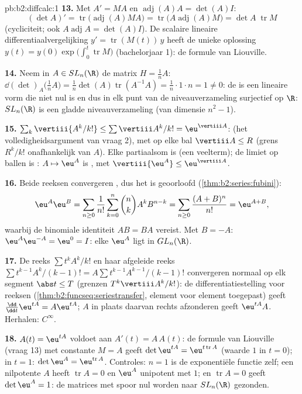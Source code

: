 \begin{solution}{pb:b2:diffcalc:1}
\textbf{13.} Met $A' = MA$ en $\operatorname{adj}(A)A = \det(A)I$:
\[
(\det A)' = \operatorname{tr}\bigl(\operatorname{adj}(A)MA
\bigr)
= \operatorname{tr}\bigl(A\operatorname{adj}(A)M\bigr)
= \det A\;\operatorname{tr}M
\]
(cycliciteit; ook $A\operatorname{adj}A = \det(A) I$). De scalaire
lineaire differentiaalvergelijking $y' = \operatorname{tr}(M(t))\,y$
heeft de unieke oplossing $y(t) = y(0)\exp\bigl(\int_0^t
\operatorname{tr}M\bigr)$ (bachelorjaar 1): de formule van
Liouville.

\textbf{14.} Neem in $A \in SL_n(\R)$ de matrix $H = \frac1nA$:
$\dd(\det)_A\bigl(\tfrac1nA\bigr) = \frac1n\det(A)
\operatorname{tr}(A^{-1}A) = \frac1n\cdot1\cdot n = 1 \neq 0$: de
 is een lineaire vorm die niet nul is en dus in elk
punt van de niveauverzameling surjectief op $\R$: $SL_n(\R)$ is een
gladde niveauverzameling (van dimensie $n^2 - 1$).

\textbf{15.} $\sum_k\vertiii{A^k/k!} \leq \sum\vertiii A^k/k! =
\eu^{\vertiii A}$:  (het volledigheidsargument
van vraag 2), met  op elke bal $\vertiii A \leq
R$ (grens $R^k/k!$ onafhankelijk van $A$). Elke partiaalsom is
 (een veelterm); de  limiet op ballen is : $A
\mapsto \eu^A$ is , met $\vertiii{\eu^A} \leq \eu^{\vertiii
A}$.

\textbf{16.} Beide reeksen convergeren , dus het
 is geoorloofd (\cref{thm:b2:series:fubini}):
\[
\eu^A\eu^B = \sum_{n\geq0}\frac{1}{n!}\sum_{k=0}^n\binom
nkA^kB^{n-k}
= \sum_{n\geq0}\frac{(A+B)^n}{n!} = \eu^{A+B},
\]
waarbij de binomiale identiteit $AB = BA$ vereist. Met $B = -A$:
$\eu^A\eu^{-A} = \eu^0 = I$: elke $\eu^A$ ligt in $GL_n(\R)$.

\textbf{17.} De reeks $\sum t^kA^k/k!$ en haar afgeleide reeks
$\sum t^{k-1}A^k/(k-1)! = A\sum t^{k-1}A^{k-1}/(k-1)!$ convergeren
normaal op elk segment $\abs t \leq T$ (grenzen $T^k\vertiii
A^k/k!$): de differentiatiestelling voor reeksen
(\cref{thm:b2:funcseq:seriestransfer}, element voor element
toegepast) geeft $\frac{\dd}{\dd t}\eu^{tA} = A\eu^{tA}$; $A$ in
plaats daarvan rechts afzonderen geeft $\eu^{tA}A$. Herhalen:
$C^\infty$.

\textbf{18.} $A(t) = \eu^{tA}$ voldoet aan $A'(t) = A\,A(t)$: de
formule van Liouville (vraag 13) met constante $M = A$ geeft
$\det\eu^{tA} = \eu^{t\operatorname{tr}A}$ (waarde $1$ in $t = 0$);
in $t = 1$: $\det\eu^A = \eu^{\operatorname{tr}A}$. Controles: $n =
1$ is de exponentiële functie zelf; een nilpotente $A$ heeft
$\operatorname{tr}A = 0$ en $\eu^A$ unipotent met  $1$;
en $\operatorname{tr}A = 0$ geeft $\det\eu^A = 1$: de matrices met
spoor nul worden naar $SL_n(\R)$ gezonden.


\end{solution}
